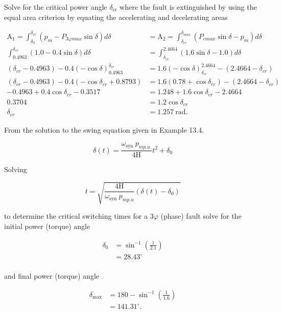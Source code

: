 \documentclass[main.tex]{subfiles}
\begin{document}
\begin{enumerate}
Solve for the critical power angle $\delta_{\mathrm{cr}}$ where the fault is extinguished by using the equal area criterion by equating the accelerating and decelerating areas 

$$
\begin{aligned}
\mathrm{A}_1=\int_{\delta_0}^{\delta_{cr}} (p_m - P_{3 \varphi max} \sin \delta) d\delta 
&= \mathrm{A}_2 = \int_{\delta_{cr}}^{\delta_{max}} (P_{cmax} \sin \delta - p_m) d \delta \\
\int_{0.4963}^{\delta_{cr}} (1.0-0.4 \sin \delta) d\delta &= \int_{\delta_{cr}}^{2.4664}(1.6 \sin \delta-1.0) d \delta \\
(\delta_{cr} - 0.4963) - 0.4(-\cos \delta)_{0.4963}^{\delta_{cr}} &= 1.6(-\cos \delta)_{\delta_{c r}}^{2.4664}-\left(2.4664-\delta_{c r}\right) \\
\left(\delta_{cr} - 0.4963\right) - 0.4\left(-\cos \delta_{cr} + 0.8793 \right) &= 1.6\left(0.78 + \cos \delta_{cr}\right) - \left(2.4664-\delta_{cr}\right) \\
-0.4963 + 0.4 \cos \delta_{cr} - 0.3517 &= 1.248 + 1.6 \cos \delta_{cr} - 2.4664 \\
0.3704 &= 1.2 \cos \delta_{c r} \\
\delta_{c r} &= 1.257 \mathrm{~rad}.
\end{aligned}
$$


From the solution to the swing equation given in Example 13.4.

$$
\delta(t)=\frac{\omega_{\text {syn }} p_{m p . u .}}{4 \mathrm{H}} t^2+\delta_0
$$

Solving

$$
t=\sqrt{\frac{4 \mathrm{H}}{\omega_{\text {syn }} p_{m p . u}}\left(\delta(t)-\delta_0\right)}
$$

to determine the critical switching times for a $3 \varphi$ (phase) fault solve for the initial power (torque) angle

$$
\begin{aligned}
\delta_0 &= \sin ^{-1}\left(\frac{1}{2.1}\right)\\
&=28.43^{\circ} \\
\end{aligned}
$$

and final power (torque) angle 

$$
\begin{aligned}
\delta_{\text{max}} &= 180-\sin ^{-1}\left(\frac{1}{1.6}\right)\\
&=141.31^{\circ}.
\end{aligned}
$$


\end{enumerate}
\end{document}
